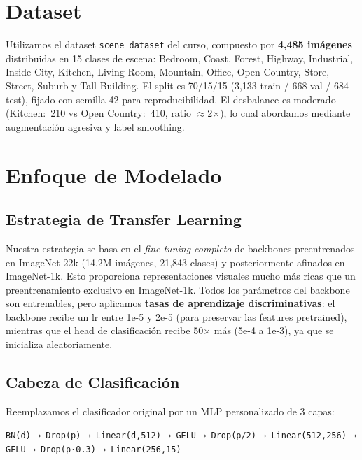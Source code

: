\documentclass[10pt,a4paper,twocolumn]{article}
\begin{document}
\section{Dataset}

Utilizamos el dataset \texttt{scene\_dataset} del curso, compuesto por \textbf{4,485 imágenes} distribuidas en 15 clases de escena: Bedroom, Coast, Forest, Highway, Industrial, Inside City, Kitchen, Living Room, Mountain, Office, Open Country, Store, Street, Suburb y Tall Building. El split es 70/15/15 (3,133 train / 668 val / 684 test), fijado con semilla 42 para reproducibilidad. El desbalance es moderado (Kitchen:~210 vs Open Country:~410, ratio $\approx$2$\times$), lo cual abordamos mediante augmentación agresiva y label smoothing.

\section{Enfoque de Modelado}

\subsection{Estrategia de Transfer Learning}

Nuestra estrategia se basa en el \emph{fine-tuning completo} de backbones preentrenados en ImageNet-22k (14.2M imágenes, 21,843 clases) y posteriormente afinados en ImageNet-1k. Esto proporciona representaciones visuales mucho más ricas que un preentrenamiento exclusivo en ImageNet-1k. Todos los parámetros del backbone son entrenables, pero aplicamos \textbf{tasas de aprendizaje discriminativas}: el backbone recibe un lr entre 1e-5 y 2e-5 (para preservar las features pretrained), mientras que el head de clasificación recibe 50$\times$ más (5e-4 a 1e-3), ya que se inicializa aleatoriamente.

\subsection{Cabeza de Clasificación}

Reemplazamos el clasificador original por un MLP personalizado de 3 capas:

\smallskip
\noindent\texttt{BN(d) → Drop(p) → Linear(d,512) → GELU → Drop(p/2) → Linear(512,256) → GELU → Drop(p·0.3) → Linear(256,15)}
\smallskip
\end{document}
